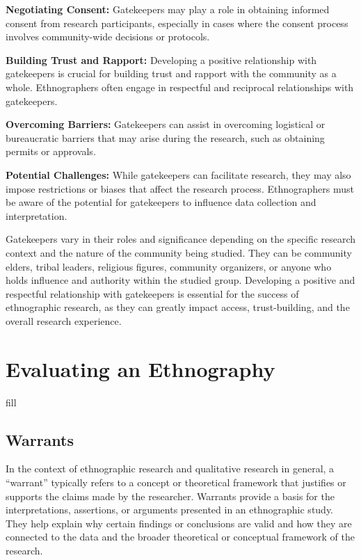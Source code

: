 \documentclass[
  b5paper]{book}
\begin{document}
\textbf{Negotiating Consent:} Gatekeepers may play a role in obtaining informed consent from research participants, especially in cases where the consent process involves community-wide decisions or protocols.

\textbf{Building Trust and Rapport:} Developing a positive relationship with gatekeepers is crucial for building trust and rapport with the community as a whole. Ethnographers often engage in respectful and reciprocal relationships with gatekeepers.

\textbf{Overcoming Barriers:} Gatekeepers can assist in overcoming logistical or bureaucratic barriers that may arise during the research, such as obtaining permits or approvals.

\textbf{Potential Challenges:} While gatekeepers can facilitate research, they may also impose restrictions or biases that affect the research process. Ethnographers must be aware of the potential for gatekeepers to influence data collection and interpretation.

Gatekeepers vary in their roles and significance depending on the specific research context and the nature of the community being studied. They can be community elders, tribal leaders, religious figures, community organizers, or anyone who holds influence and authority within the studied group. Developing a positive and respectful relationship with gatekeepers is essential for the success of ethnographic research, as they can greatly impact access, trust-building, and the overall research experience.

\hypertarget{evaluating-an-ethnography}{%
\section{Evaluating an Ethnography}\label{evaluating-an-ethnography}}

fill

\hypertarget{warrants}{%
\subsection*{Warrants}\label{warrants}}

In the context of ethnographic research and qualitative research in general, a ``warrant'' typically refers to a concept or theoretical framework that justifies or supports the claims made by the researcher. Warrants provide a basis for the interpretations, assertions, or arguments presented in an ethnographic study. They help explain why certain findings or conclusions are valid and how they are connected to the data and the broader theoretical or conceptual framework of the research.
\end{document}
